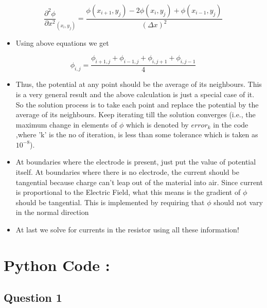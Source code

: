 \documentclass[11pt, a4paper, twoside]{article}
\begin{document}
    \begin{equation}
    \frac{\partial^{2} \phi}{\partial x^{2}}_{(x_i,y_j)} = \frac{\phi(x_{i+1},y_j) -2\phi(x_i,y_j)+ \phi(x_{i-1},y_j)}{(\Delta x)^{2}}
     \end{equation}
    
    \begin{itemize}
    \item
      Using above equations we get
    \end{itemize}
    
    \begin{equation}
            \phi_{i,j} = \frac{\phi_{i+1,j} + \phi_{i-1,j} + \phi_{i,j+1} + \phi_{i,j-1}}{4} 
    \end{equation}
    
    \begin{itemize}
    \item
      Thus, the potential at any point should be the average of its
      neighbours. This is a very general result and the above calculation is
      just a special case of it. So the solution process is to take each
      point and replace the potential by the average of its neighbours. Keep
      iterating till the solution converges (i.e., the maximum change in
      elements of \(\phi\) which is denoted by \(error_k\) in the code
      ,where 'k' is the no of iteration, is less than some tolerance which
      is taken as \(10^{-8}\)).
    \item
      At boundaries where the electrode is present, just put the value of
      potential itself. At boundaries where there is no electrode, the
      current should be tangential because charge can't leap out of the
      material into air. Since current is proportional to the Electric
      Field, what this means is the gradient of \(\phi\) should be
      tangential. This is implemented by requiring that \(\phi\) should not
      vary in the normal direction
    \item
      At last we solve for currents in the resistor using all these
      information!
  \end{itemize}

  \section{Python Code :}\label{python-code}
  \subsection{Question 1}\label{question-1}
\end{document}
